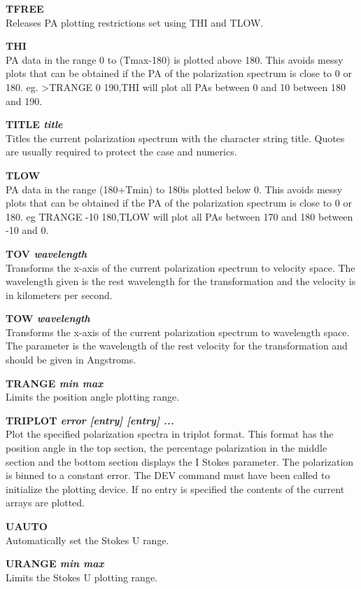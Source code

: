 \documentclass[11pt,nolof,noabs]{starlink}
\begin{document}
\textbf{TFREE} \\
Releases PA plotting restrictions set using THI and TLOW.

\textbf{THI} \\
PA data in the range 0 to (Tmax-180) is plotted above 180. This avoids messy
plots that can be obtained if the PA of the polarization spectrum is close
to 0 or 180. eg. >TRANGE 0 190,THI will plot all PAs between 0 and 10 between
180 and 190.

\textbf{TITLE \it title } \\
Titles the current polarization spectrum with the character string  title.
Quotes are usually required to protect the case and numerics.

\textbf{TLOW} \\
PA data in the range (180+Tmin) to 180is plotted below 0. This avoids messy
plots that can be obtained if the PA of the polarization spectrum is close to 0
or 180. eg TRANGE -10 180,TLOW will plot all PAs between 170 and 180 between
-10 and 0.

\textbf{TOV \it wavelength } \\
Transforms the x-axis of the current polarization spectrum to velocity
space. The wavelength given is the rest wavelength for the transformation and
the velocity is in kilometers per second.

\textbf{TOW \it wavelength } \\
Transforms the x-axis of the current polarization spectrum to wavelength
space. The parameter is the wavelength of the rest velocity for the
transformation and should be given in Angstroms.

\textbf{TRANGE \it min max } \\
Limits the position angle plotting range.

\textbf{TRIPLOT \it error [entry] [entry] ...} \\
Plot the specified polarization spectra in triplot format. This format has the
position angle in the top section, the percentage polarization in the middle
section and the bottom section displays the I Stokes parameter. The
polarization is binned to a constant error. The  DEV command must have been
called to initialize the plotting device. If no  entry is specified the
contents of the current arrays are plotted.

\textbf{UAUTO} \\
Automatically set the Stokes U range.

\textbf{URANGE  \it min max } \\
Limits the Stokes U  plotting range.
\end{document}
